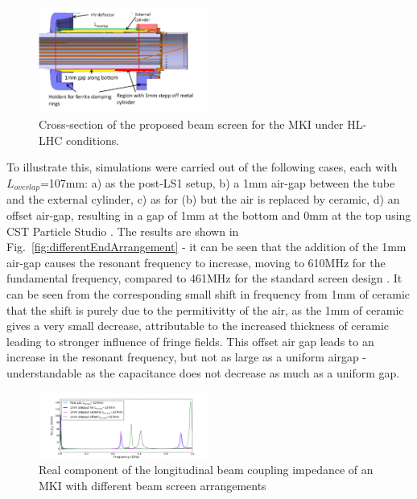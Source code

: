 \documentclass[a4paper,
              ]{jacow}
\begin{document}
\begin{figure}
\begin{center}
\includegraphics[width=0.5\textwidth]{HLLHCLayout.pdf}
\caption{Cross-section of the proposed beam screen for the MKI under HL-LHC conditions.}
\label{fig:BeamScreenHLLHC}
\end{center}
\end{figure}

To illustrate this, simulations were carried out of the following cases, each with $L_{overlap}$=107mm: a) as the post-LS1 setup, b) a 1mm air-gap between the tube and the external cylinder, c) as for (b) but the air is replaced by ceramic, d) an offset air-gap, resulting in a gap of 1mm at the bottom and 0mm at the top using CST Particle Studio \cite{cst-cite}. The results are shown in Fig.~\ref{fig:differentEndArrangement} - it can be seen that the addition of the 1mm air-gap causes the resonant frequency to increase, moving to 610MHz for the fundamental frequency, compared to 461MHz for the standard screen design . It can be seen from the corresponding small shift in frequency from 1mm of ceramic that the shift is purely due to the permitivitty of the air, as the 1mm of ceramic gives a very small decrease, attributable to the increased thickness of ceramic leading to stronger influence of fringe fields. This offset air gap leads to an increase in the resonant frequency, but not as large as a uniform airgap - understandable as the capacitance does not decrease as much as a uniform gap.

\begin{figure}
\begin{center}
\includegraphics[width=0.5\textwidth]{differentScreenSpacings.pdf}
\caption{Real component of the longitudinal beam coupling impedance of an MKI with different beam screen arrangements}
\label{fig:differenEndArrangement}
\end{center}
\end{figure}
\end{document}
